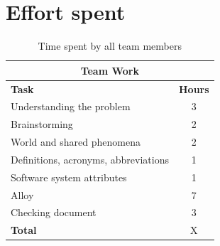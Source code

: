 \documentclass[hidelinks, 12pt]{report}
\begin{document}
	\chapter{Effort spent}
	\begin{table}[h]
		\centering
		\begin{tabular}{l c}
			\hline\hline
			\multicolumn{2}{c}{\textbf{Team Work}} \\
			\hline
			\textbf{Task} & \textbf{Hours} \\ [0.5ex]
			\hline
			Understanding the problem & 3  \\
			Brainstorming & 2 \\
			World and shared phenomena & 2 \\
			Definitions, acronyms, abbreviations & 1  \\
			Software system attributes & 1 \\
			Alloy & 7 \\
			Checking document  & 3  \\
			\hline
			\textbf{Total} & X  \\
			\hline
		\end{tabular}
		\caption{Time spent by all team members}
		\label{fig:Time spent by all team members}
	\end{table}
	
\end{document}
